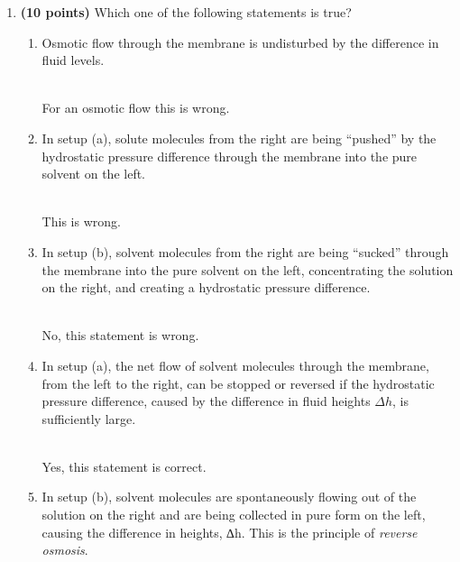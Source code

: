 \documentclass[fleqn]{article}
\begin{document}
  \begin{enumerate}
    \item \textbf{(10 points)} Which one of the following statements is true?
      \begin{enumerate}
        \item Osmotic flow through the membrane is undisturbed by the difference in fluid levels.

          \textcolor{hwColor}{
            \\
            For an osmotic flow this is wrong.
            \\
          }


        \item In setup (a), solute molecules from the right are being “pushed” by the hydrostatic pressure
        difference through the membrane into the pure solvent on the left.

          \textcolor{hwColor}{
            \\
            This is wrong.
            \\
          }

        \item In setup (b), solvent molecules from the right are being “sucked” through the membrane
        into the pure solvent on the left, concentrating the solution on the right, and creating a
        hydrostatic pressure difference.

          \textcolor{hwColor}{
            \\
            No, this statement is wrong.
            \\
          }

        \item  In setup (a), the net flow of solvent molecules through the membrane, from the left to
        the right, can be stopped or reversed if the hydrostatic pressure difference, caused by the
        difference in fluid heights $\Delta h$, is sufficiently large.

          \textcolor{hwColor}{
            \\
            Yes, this statement is correct.
            \\
          }

        \item In setup (b), solvent molecules are spontaneously flowing out of the solution on the right
        and are being collected in pure form on the left, causing the difference in heights, ∆h. This
        is the principle of \emph{reverse osmosis}.


\end{enumerate}
\end{enumerate}
\end{document}
